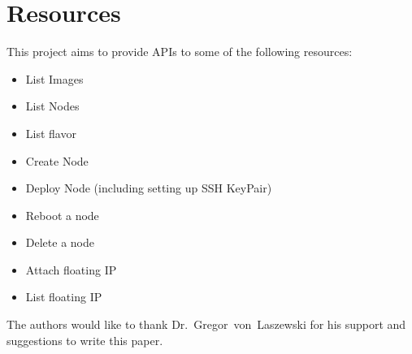 \section{Resources}
This project aims to provide APIs to some of the following resources:
\begin{itemize}
\item List Images
\item List Nodes
\item List flavor
\item Create Node
\item Deploy Node (including setting up SSH KeyPair)
\item Reboot a node
\item Delete a node 
\item Attach floating IP
\item List floating IP 
\end{itemize}


\begin{acks}

  The authors would like to thank Dr.~Gregor~von~Laszewski for his
  support and suggestions to write this paper.

\end{acks}


 

